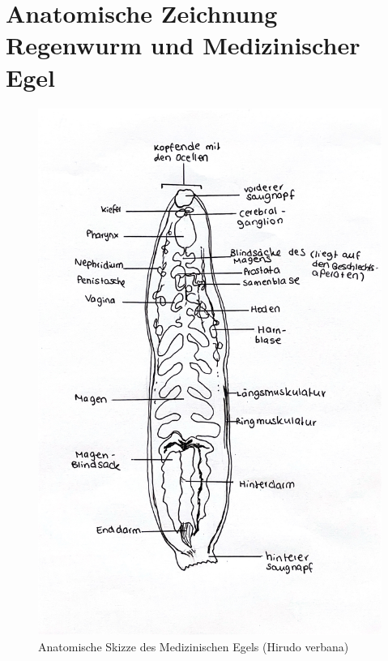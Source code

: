 \documentclass[oneside,10pt,a4paper]{report}
\begin{document}
		\section{Anatomische Zeichnung Regenwurm und Medizinischer Egel}
		\begin{figure}[H]
			\centering
			\includegraphics[scale=0.25]{Egel.JPG}
			\caption{Anatomische Skizze des Medizinischen Egels (Hirudo verbana)}
			\label{fig:Egel_ana}
		\end{figure}
		
\end{document}
